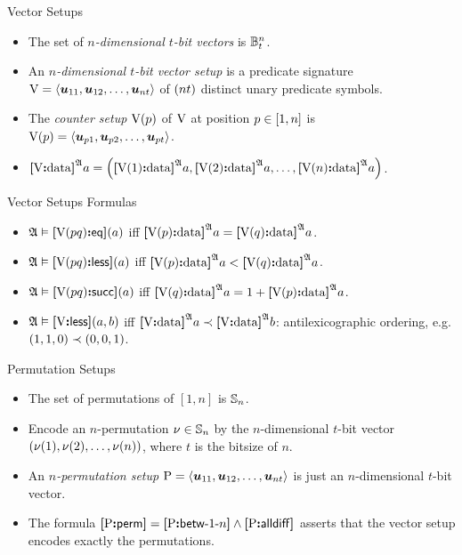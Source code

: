 \documentclass{beamer}
\begin{document}
\begin{frame}{Vector Setups}
\begin{itemize}
  \item The set of \emph{$n$-dimensional $t$-bit vectors} is
  $\ntBitnums\nn\tbit$.
  \item An \emph{$n$-dimensional $t$-bit vector setup} is a predicate signature 
  $\VS = \seq{\suu{11}, \suu{12}, \dots, \suu{\nn\tbit}}$ of $(\nn\tbit)$
  distinct unary predicate symbols.
  \item The \emph{counter setup $\VSp\posp$} of $\VS$ at position $\posp \in [1,\nn]$
  is $\VSp\posp = \seq{\suu{\posp1},\suu{\posp2},\dots,\suu{\posp\tbit}}$.
  \item
    $\data\VS\StrA\ea = \left(\data{\VSp1}\StrA\ea,\data{\VSp2}\StrA\ea, \dots,
    \data{\VSp\nn}\StrA\ea\right)$.
\end{itemize}
\end{frame}

\begin{frame}{Vector Setups Formulas}
\begin{itemize}
  \item $\StrA\vDash\feqP\VS\posp\posq(\ea)$ iff $\data{\VSp\posp}\StrA\ea =
  \data{\VSp\posq}\StrA\ea$.
  \item $\StrA\vDash\flessP\VS\posp\posq(\ea)$ iff $\data{\VSp\posp}\StrA\ea <
  \data{\VSp\posq}\StrA\ea$.
  \item $\StrA\vDash\fsuccP\VS\posp\posq(\ea)$ iff $\data{\VSp\posq}\StrA\ea =
  1 + \data{\VSp\posp}\StrA\ea$.
  \item $\StrA\vDash\fless\VS(\ea,\eb)$ iff
  $\data{\VS}\StrA\ea\lexlt\data{\VS}\StrA\eb$: antilexicographic ordering,
  e.g. $(1,1,0)\lexlt (0,0,1)$.
\end{itemize}
\end{frame}

\begin{frame}{Permutation Setups}
\begin{itemize}
  \item The set of permutations of $[1,n]$ is $\Perms\nn$.
  \item Encode an $n$-permutation $\permnu\in\Perms\nn$ by the
  $n$-dimensional $t$-bit vector $(\permnu(1), \permnu(2), \dots, \permnu(n))$, where $t$ is the bitsize
  of $n$.
  \item An \emph{$n$-permutation setup} $\PS =
  \seq{\suu{11},\suu{12},\dots,\suu{nt}}$ is just an $n$-dimensional $t$-bit
  vector.
  \item The formula
  $\fperm\PS = \fbetw\PS1\nn \land \falldiff\PS$ asserts that the vector setup
  encodes exactly the permutations.
\end{itemize}
\end{frame}
\end{document}
